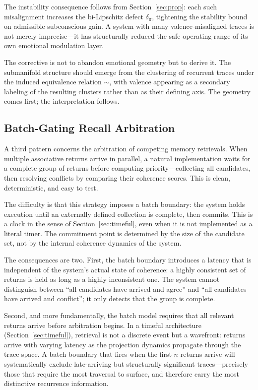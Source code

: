 \documentclass[12pt,a4paper]{article}
\begin{document}
The instability consequence follows from Section~\ref{sec:prop}: each such misalignment increases the bi-Lipschitz defect $\delta_\pi$, tightening the stability bound on admissible subconscious gain. A system with many valence-misaligned traces is not merely imprecise---it has structurally reduced the safe operating range of its own emotional modulation layer.

The corrective is not to abandon emotional geometry but to derive it. The submanifold structure should emerge from the clustering of recurrent traces under the induced equivalence relation $\sim$, with valence appearing as a secondary labeling of the resulting clusters rather than as their defining axis. The geometry comes first; the interpretation follows.

\subsection{Batch-Gating Recall Arbitration}

A third pattern concerns the arbitration of competing memory retrievals. When multiple associative returns arrive in parallel, a natural implementation waits for a complete group of returns before computing priority---collecting all candidates, then resolving conflicts by comparing their coherence scores. This is clean, deterministic, and easy to test.

The difficulty is that this strategy imposes a batch boundary: the system holds execution until an externally defined collection is complete, then commits. This is a clock in the sense of Section~\ref{sec:timeful}, even when it is not implemented as a literal timer. The commitment point is determined by the size of the candidate set, not by the internal coherence dynamics of the system.

The consequences are two. First, the batch boundary introduces a latency that is independent of the system's actual state of coherence: a highly consistent set of returns is held as long as a highly inconsistent one. The system cannot distinguish between ``all candidates have arrived and agree'' and ``all candidates have arrived and conflict''; it only detects that the group is complete.

Second, and more fundamentally, the batch model requires that all relevant returns arrive before arbitration begins. In a timeful architecture (Section~\ref{sec:timeful}), retrieval is not a discrete event but a wavefront: returns arrive with varying latency as the projection dynamics propagate through the trace space. A batch boundary that fires when the first $n$ returns arrive will systematically exclude late-arriving but structurally significant traces---precisely those that require the most traversal to surface, and therefore carry the most distinctive recurrence information.
\end{document}
